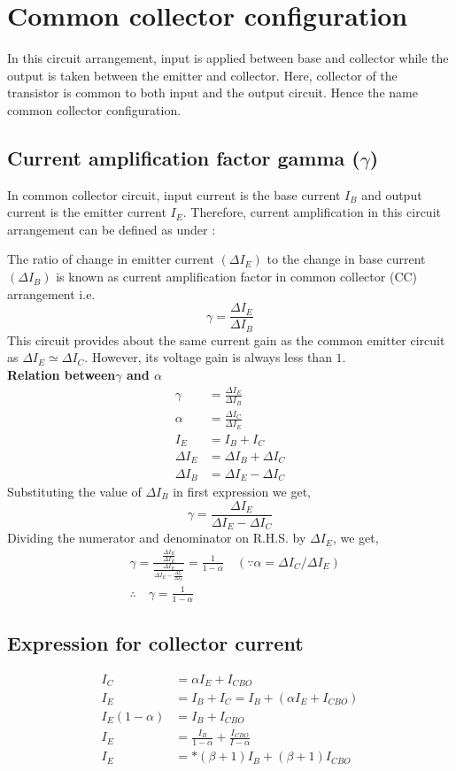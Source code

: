 \section{Common collector configuration} 
In this circuit arrangement, input is applied between base and collector while the output is taken between the emitter and collector. Here, collector of the transistor is common to both input and the output circuit. Hence the name common collector configuration.
 \subsection{Current amplification factor gamma ($\gamma$)}
 In common collector circuit, input current is the base current $I_{B}$ and output current is the emitter current $I_{E}$. Therefore, current amplification in this circuit arrangement can be defined as under :
 
 The ratio of change in emitter current $\left(\Delta I_{E}\right)$ to the change in base current $\left(\Delta I_{B}\right)$ is known as current amplification factor in common collector (CC) arrangement i.e.
 $$
 \gamma=\frac{\Delta I_{E}}{\Delta I_{B}}
 $$
 This circuit provides about the same current gain as the common emitter circuit as $\Delta I_{E} \simeq \Delta I_{C}$. However, its voltage gain is always less than $1 .$\\
 \textbf{ Relation between$ \gamma$  and $ \alpha$}
 $$
 \begin{aligned}
 \gamma &=\frac{\Delta I_{E}}{\Delta I_{B}} \\
 \alpha &=\frac{\Delta I_{C}}{\Delta I_{E}} \\
 I_{E} &=I_{B}+I_{C} \\
 \Delta I_{E} &=\Delta I_{B}+\Delta I_{C} \\
 \Delta I_{B} &=\Delta I_{E}-\Delta I_{C}
 \end{aligned}
 $$
 Substituting the value of $\Delta I_{B}$ in first expression we get,
 $$
 \gamma=\frac{\Delta I_{E}}{\Delta I_{E}-\Delta I_{C}}
 $$
 Dividing the numerator and denominator on R.H.S. by $\Delta I_{E}$, we get,
 $$
 \begin{aligned}
 &\gamma=\frac{\frac{\Delta I_{E}}{\Delta I_{E}}}{\frac{\Delta I_{E}}{\Delta I_{E}-\frac{\Delta I_{C}}{\Delta I_{E}}}}=\frac{1}{1-\alpha} \quad\left(\because \alpha=\Delta I_{C} / \Delta I_{E}\right) \\
 &\therefore \quad \gamma=\frac{1}{1-\alpha}
 \end{aligned}
 $$
 \subsection{Expression for collector current}
 $$
 \begin{aligned}
 	I_{C} &=\alpha I_{E}+I_{C B O} \\
 	I_{E} &=I_{B}+I_{C}=I_{B}+\left(\alpha I_{E}+I_{C B O}\right) \\
 	I_{E}(1-\alpha) &=I_{B}+I_{C B O} \\
 	I_{E} &=\frac{I_{B}}{1-\alpha}+\frac{I_{C B O}}{I-\alpha} \\
 	I_{E} &=*(\beta+1) I_{B}+(\beta+1) I_{C B O}
 \end{aligned}
 $$
